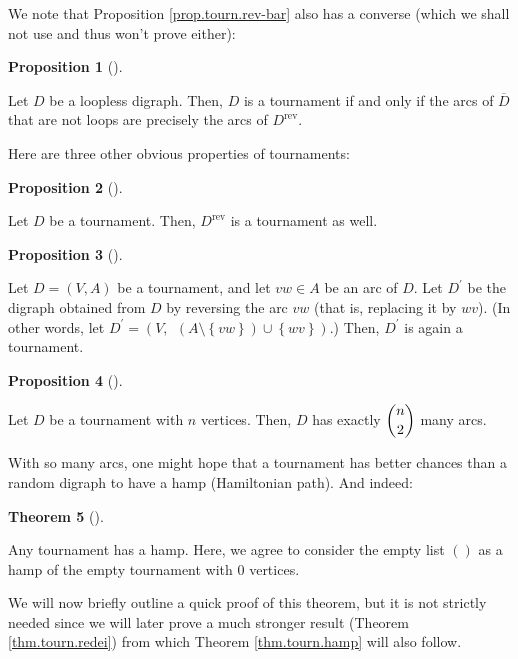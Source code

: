 \documentclass[numbers=enddot,12pt,final,onecolumn,notitlepage]{scrartcl}%
\numberwithin{exer}{subsection}
\theoremstyle{definition}
\newtheorem{theo}{Theorem}[subsection]
\newenvironment{theorem}[1][]
{\begin{theo}[#1]\begin{leftbar}}
{\end{leftbar}\end{theo}}
\newtheorem{prop}[theo]{Proposition}
\newenvironment{proposition}[1][]
{\begin{prop}[#1]\begin{leftbar}}
{\end{leftbar}\end{prop}}
\begin{document}
We note that Proposition \ref{prop.tourn.rev-bar} also has a converse (which
we shall not use and thus won't prove either):

\begin{proposition}
Let $D$ be a loopless digraph. Then, $D$ is a tournament if and only if the
arcs of $\overline{D}$ that are not loops are precisely the arcs of
$D^{\operatorname*{rev}}$.
\end{proposition}

Here are three other obvious properties of tournaments:

\begin{proposition}
Let $D$ be a tournament. Then, $D^{\operatorname*{rev}}$ is a tournament as well.
\end{proposition}

\begin{proposition}
\label{prop.tourn.rev-arc}Let $D=\left(  V,A\right)  $ be a tournament, and
let $vw\in A$ be an arc of $D$. Let $D^{\prime}$ be the digraph obtained from
$D$ by reversing the arc $vw$ (that is, replacing it by $wv$). (In other
words, let $D^{\prime}=\left(  V,\ \ \left(  A\setminus\left\{  vw\right\}
\right)  \cup\left\{  wv\right\}  \right)  $.) Then, $D^{\prime}$ is again a tournament.
\end{proposition}

\begin{proposition}
Let $D$ be a tournament with $n$ vertices. Then, $D$ has exactly $\dbinom
{n}{2}$ many arcs.
\end{proposition}

With so many arcs, one might hope that a tournament has better chances than a
random digraph to have a hamp (Hamiltonian path). And indeed:

\begin{theorem}
[R\'{e}dei's Little Theorem]\label{thm.tourn.hamp}Any tournament has a hamp.
Here, we agree to consider the empty list $\left(  {}\right)  $ as a hamp of
the empty tournament with $0$ vertices.
\end{theorem}

We will now briefly outline a quick proof of this theorem, but it is not
strictly needed since we will later prove a much stronger result (Theorem
\ref{thm.tourn.redei}) from which Theorem \ref{thm.tourn.hamp} will also follow.
\end{document}
